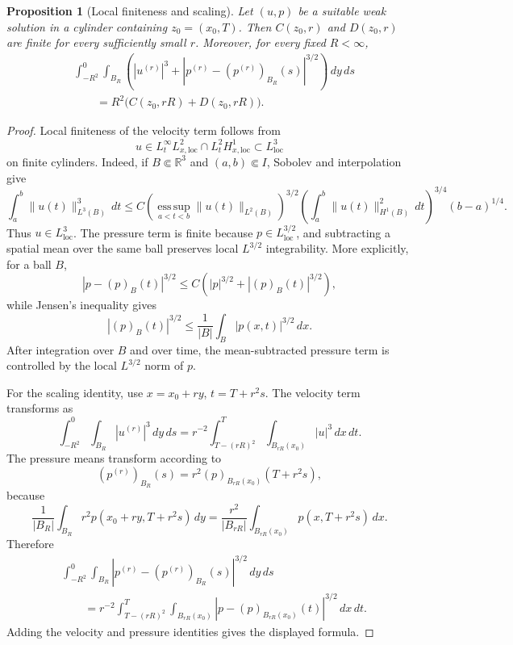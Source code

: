 \documentclass[11pt]{amsart}
\theoremstyle{plain}
\newtheorem{proposition}[proposition]{Proposition}
\theoremstyle{definition}
\theoremstyle{remark}
\numberwithin{equation}{section}
\begin{document}
\begin{proposition}[Local finiteness and scaling]\label{p0:prop:critical-scaling}
Let \((u,p)\) be a suitable weak solution in a cylinder containing
\(z_0=(x_0,T)\).  Then
\(C(z_0,r)\) and \(D(z_0,r)\) are finite for every sufficiently small \(r\).
Moreover, for every fixed \(R<\infty\),
\[
\begin{aligned}
&\int_{-R^2}^{0}\int_{B_R}
\left(
|u^{(r)}|^3+
|p^{(r)}-(p^{(r)})_{B_R}(s)|^{3/2}
\right)\,dy\,ds \\
&\qquad
=R^2\bigl(C(z_0,rR)+D(z_0,rR)\bigr).
\end{aligned}
\]
\end{proposition}

\begin{proof}
Local finiteness of the velocity term follows from
\[
  u\in L^\infty_tL^2_{x,\mathrm{loc}}
  \cap L^2_tH^1_{x,\mathrm{loc}}
  \subset L^3_{\mathrm{loc}}
\]
on finite cylinders.  Indeed, if \(B\Subset\mathbb R^3\) and
\((a,b)\Subset I\), Sobolev and interpolation give
\[
  \int_a^b \|u(t)\|_{L^3(B)}^3\,dt
  \le
  C
  \left(\operatorname*{ess\,sup}_{a<t<b}\|u(t)\|_{L^2(B)}\right)^{3/2}
  \left(\int_a^b \|u(t)\|_{H^1(B)}^2\,dt\right)^{3/4}
  (b-a)^{1/4}.
\]
Thus \(u\in L^3_{\mathrm{loc}}\).  The pressure term is finite because
\(p\in L^{3/2}_{\mathrm{loc}}\), and subtracting a spatial mean over the same
ball preserves local \(L^{3/2}\) integrability.  More explicitly, for a ball
\(B\),
\[
  |p-(p)_B(t)|^{3/2}\le C\left(|p|^{3/2}+|(p)_B(t)|^{3/2}\right),
\]
while Jensen's inequality gives
\[
  |(p)_B(t)|^{3/2}
  \le \frac1{|B|}\int_B |p(x,t)|^{3/2}\,dx.
\]
After integration over \(B\) and over time, the mean-subtracted pressure term is
controlled by the local \(L^{3/2}\) norm of \(p\).

For the scaling identity, use \(x=x_0+ry\), \(t=T+r^2s\).  The velocity term
transforms as
\[
  \int_{-R^2}^{0}\int_{B_R}|u^{(r)}|^3\,dy\,ds
  =r^{-2}\int_{T-(rR)^2}^{T}\int_{B_{rR}(x_0)}|u|^3\,dx\,dt.
\]
The pressure means transform according to
\[
  (p^{(r)})_{B_R}(s)=r^2(p)_{B_{rR}(x_0)}(T+r^2s),
\]
because
\[
  \frac1{|B_R|}\int_{B_R} r^2p(x_0+ry,T+r^2s)\,dy
  =
  \frac{r^2}{|B_{rR}|}\int_{B_{rR}(x_0)}p(x,T+r^2s)\,dx .
\]
Therefore
\[
\begin{aligned}
&\int_{-R^2}^{0}\int_{B_R}
|p^{(r)}-(p^{(r)})_{B_R}(s)|^{3/2}\,dy\,ds \\
&\qquad =
r^{-2}\int_{T-(rR)^2}^{T}\int_{B_{rR}(x_0)}
|p-(p)_{B_{rR}(x_0)}(t)|^{3/2}\,dx\,dt .
\end{aligned}
\]
Adding the velocity and pressure identities gives the displayed formula.
\end{proof}
\end{document}
